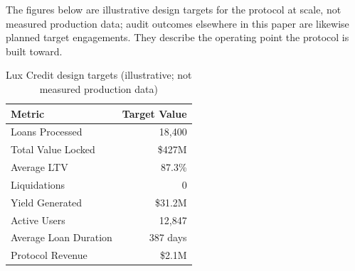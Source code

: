 The figures below are illustrative design targets for the protocol at scale, not
measured production data; audit outcomes elsewhere in this paper are likewise
planned target engagements. They describe the operating point the protocol is
built toward.

\begin{table}[h]
\centering
\begin{tabular}{@{}lr@{}}
\toprule
\textbf{Metric} & \textbf{Target Value} \\ \midrule
Loans Processed & 18,400 \\
Total Value Locked & \$427M \\
Average LTV & 87.3\% \\
Liquidations & 0 \\
Yield Generated & \$31.2M \\
Active Users & 12,847 \\
Average Loan Duration & 387 days \\
Protocol Revenue & \$2.1M \\ \bottomrule
\end{tabular}
\caption{Lux Credit design targets (illustrative; not measured production data)}
\end{table}

